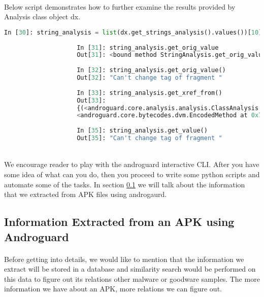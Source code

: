\documentclass[../main.tex]{subfile}
\begin{document}
			\paragraph{} Below script demonstrates how to further examine the results provided by Analysis class object dx.
				\begin{lstlisting}[language=python]
					In [30]: string_analysis = list(dx.get_strings_analysis().values())[10]
					
					In [31]: string_analysis.get_orig_value
					Out[31]: <bound method StringAnalysis.get_orig_value of <androguard.core.analysis.analysis.StringAnalysis object at 0x7fd6247ff7b8>>
					
					In [32]: string_analysis.get_orig_value()
					Out[32]: "Can't change tag of fragment "
					
					In [33]: string_analysis.get_xref_from()
					Out[33]: 
					{(<androguard.core.analysis.analysis.ClassAnalysis at 0x7fd62588d320>,
					<androguard.core.bytecodes.dvm.EncodedMethod at 0x7fd626197b00>)}
					
					In [35]: string_analysis.get_value()
					Out[35]: "Can't change tag of fragment "
					
				\end{lstlisting}
				
			\paragraph{} We encourage reader to play with the androguard interactive CLI. After you have some idea of what can you do, then you proceed to write some python scripts and automate some of the tasks. In section \ref{sec:androgaurd_static_analysis} we will talk about the information that we extracted from APK files using androgaurd.
			
		
		\subsection{Information Extracted from an APK using Androguard}\label{sec:androgaurd_static_analysis}
		\paragraph{} Before getting into details, we would like to mention that the information we extract will be stored in a database and similarity search would be performed on this data to figure out its relations other malware or goodware samples. The more information we have about an APK, more relations we can figure out.
\end{document}

